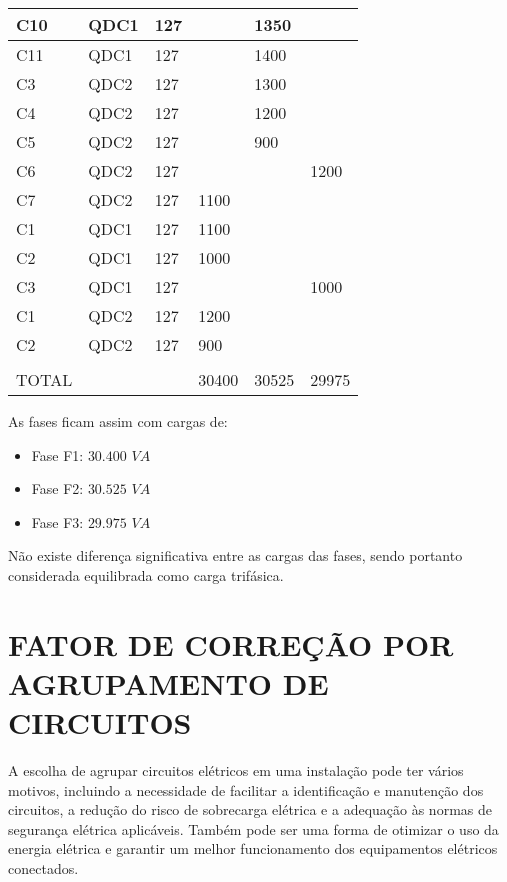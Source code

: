 \begin{longtable}{|l|l|l|l|l|l|}
	C10      & QDC1   & 127    &         & 1350    &         \\ \hline
	C11      & QDC1   & 127    &         & 1400    &         \\ \hline
	C3       & QDC2   & 127    &         & 1300    &         \\ \hline
	C4       & QDC2   & 127    &         & 1200    &         \\ \hline
	C5       & QDC2   & 127    &         & 900     &         \\ \hline
	C6       & QDC2   & 127    &         &         & 1200    \\ \hline
	C7       & QDC2   & 127    & 1100    &         &         \\ \hline
	C1       & QDC1   & 127    & 1100    &         &         \\ \hline
	C2       & QDC1   & 127    & 1000    &         &         \\ \hline
	C3       & QDC1   & 127    &         &         & 1000    \\ \hline
	C1       & QDC2   & 127    & 1200    &         &         \\ \hline
	C2       & QDC2   & 127    & 900     &         &         \\ \hline
	&        &        &         &         &         \\ \hline
	TOTAL    &        &        & 30400   & 30525   & 29975   \\ \hline
\end{longtable}

As fases ficam assim com cargas de:

\begin{itemize}
	\item Fase F1: $30.400$ $VA$
	\item Fase F2: $30.525$ $VA$
	\item Fase F3: $29.975$ $VA$
\end{itemize}

Não existe diferença significativa entre as cargas das fases, sendo portanto considerada equilibrada como carga trifásica.

\section{FATOR DE CORREÇÃO POR AGRUPAMENTO DE CIRCUITOS}

A escolha de agrupar circuitos elétricos em uma instalação pode ter vários motivos, incluindo a necessidade de facilitar a identificação e manutenção dos circuitos, a redução do risco de sobrecarga elétrica e a adequação às normas de segurança elétrica aplicáveis. Também pode ser uma forma de otimizar o uso da energia elétrica e garantir um melhor funcionamento dos equipamentos elétricos conectados.

